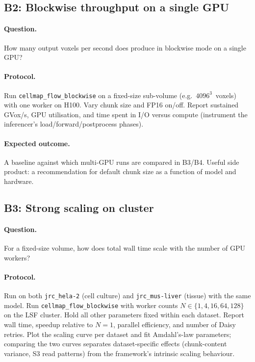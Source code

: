 \subsection*{B2: Blockwise throughput on a single GPU}

\paragraph{Question.} How many output voxels per second does \cellmapflow{} produce in blockwise mode on a single GPU?

\paragraph{Protocol.} Run \texttt{cellmap\_flow\_blockwise} on a fixed-size sub-volume (e.g.\ $4096^3$~voxels) with one worker on H100. Vary chunk size and FP16 on/off. Report sustained GVox/s, GPU utilisation, and time spent in I/O versus compute (instrument the inferencer's load/forward/postprocess phases).

\paragraph{Expected outcome.} A baseline against which multi-GPU runs are compared in B3/B4. Useful side product: a recommendation for default chunk size as a function of model and hardware.

\subsection*{B3: Strong scaling on cluster}

\paragraph{Question.} For a fixed-size volume, how does total wall time scale with the number of GPU workers?

\paragraph{Protocol.} Run on both \texttt{jrc\_hela-2} (cell culture) and \texttt{jrc\_mus-liver} (tissue) with the same model. Run \texttt{cellmap\_flow\_blockwise} with worker counts $N \in \{1, 4, 16, 64, 128\}$ on the LSF cluster. Hold all other parameters fixed within each dataset. Report wall time, speedup relative to $N=1$, parallel efficiency, and number of Daisy retries. Plot the scaling curve per dataset and fit Amdahl's-law parameters; comparing the two curves separates dataset-specific effects (chunk-content variance, S3 read patterns) from the framework's intrinsic scaling behaviour.

